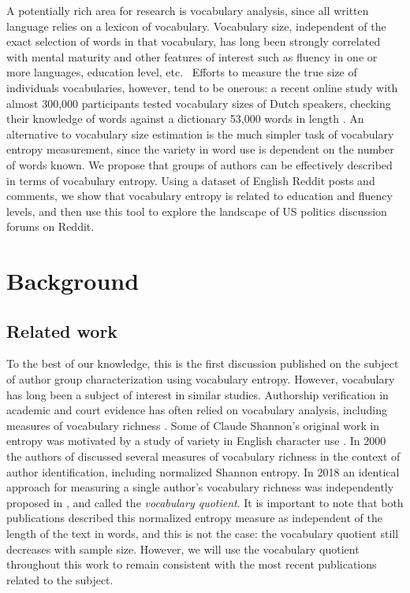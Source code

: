 \documentclass[sigconf]{acmart}
\begin{document}
A potentially rich area for research is vocabulary analysis, since all
written language relies on a lexicon of vocabulary. Vocabulary size,
independent of the exact selection of words in that vocabulary, has long
been strongly correlated with mental maturity and other features of interest
such as fluency in one or more languages, education level, etc. \cite%
{nation1993vocabulary}\cite{fox1949some} \ Efforts to measure the true size
of individuals vocabularies, however, tend to be onerous: a recent online
study with almost 300,000 participants tested vocabulary sizes of Dutch
speakers, checking their knowledge of words against a dictionary 53,000
words in length \cite{keuleers2015word}. An alternative to vocabulary size
estimation is the much simpler task of vocabulary entropy measurement, since
the variety in word use is dependent on the number of words known. We
propose that groups of authors can be effectively described in terms of
vocabulary entropy. Using a dataset of English Reddit posts and comments, we
show that vocabulary entropy is related to education and fluency levels, and
then use this tool to explore the landscape of US politics discussion forums
on Reddit. 

\section{Background}

\subsection{Related work}

To the best of our knowledge, this is the first discussion published on the
subject of author group characterization using vocabulary entropy. However,
vocabulary has long been a subject of interest in similar studies.
Authorship verification in academic and court evidence has often relied on
vocabulary analysis, including measures of vocabulary richness \cite%
{chaski2001empiricaleo}. Some of Claude Shannon's original work in entropy
was motivated by a study of variety in English character use \cite%
{shannon1951prediction}. In 2000 the authors of \cite{dale2000handbook}
discussed several measures of vocabulary richness in the context of author
identification, including normalized Shannon entropy. In 2018 an identical
approach for measuring a single author's vocabulary richness was
independently proposed in \cite{rajput2018novel}, and called the \emph{%
vocabulary quotient}. It is important to note that both publications
described this normalized entropy measure as independent of the length of
the text in words, and this is not the case: the vocabulary quotient still
decreases with sample size. However, we will use the vocabulary quotient
throughout this work to remain consistent with the most recent publications
related to the subject.
\end{document}

